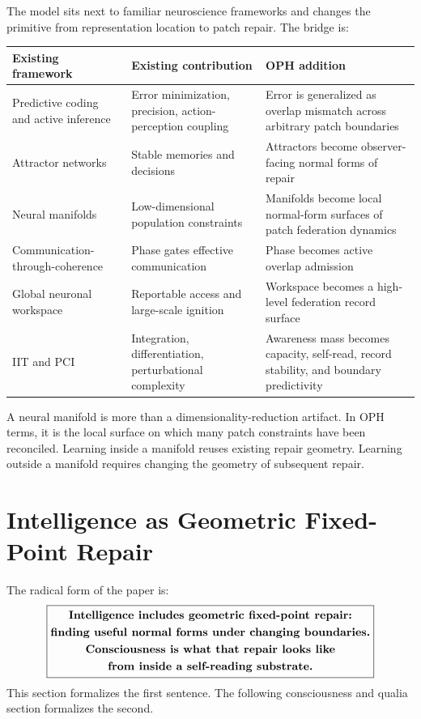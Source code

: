 \documentclass[11pt]{article}
\theoremstyle{remark}
\theoremstyle{plain}
\begin{document}
The model sits next to familiar neuroscience frameworks and changes the primitive from representation location to patch repair. The bridge is:
\begin{small}
\begin{longtable}{@{}L{0.25\textwidth}L{0.32\textwidth}L{0.34\textwidth}@{}}
\toprule
\textbf{Existing framework} & \textbf{Existing contribution} & \textbf{OPH addition} \\
\midrule
\endhead
Predictive coding and active inference~\cite{RaoBallard1999,Friston2010} & Error minimization, precision, action-perception coupling & Error is generalized as overlap mismatch across arbitrary patch boundaries \\
Attractor networks~\cite{Hopfield1982} & Stable memories and decisions & Attractors become observer-facing normal forms of repair \\
Neural manifolds~\cite{Sadtler2014,Perich2025} & Low-dimensional population constraints & Manifolds become local normal-form surfaces of patch federation dynamics \\
Communication-through-coherence~\cite{Fries2015} & Phase gates effective communication & Phase becomes active overlap admission \\
Global neuronal workspace~\cite{DehaeneChangeux2011} & Reportable access and large-scale ignition & Workspace becomes a high-level federation record surface \\
IIT and PCI~\cite{Albantakis2023IIT,Casali2013PCI} & Integration, differentiation, perturbational complexity & Awareness mass becomes capacity, self-read, record stability, and boundary predictivity \\
\bottomrule
\end{longtable}
\end{small}

A neural manifold is more than a dimensionality-reduction artifact. In OPH terms, it is the local surface on which many patch constraints have been reconciled. Learning inside a manifold reuses existing repair geometry. Learning outside a manifold requires changing the geometry of subsequent repair.

\section{Intelligence as Geometric Fixed-Point Repair}

The radical form of the paper is:
\[
\boxed{
\begin{gathered}
\text{\bfseries Intelligence includes geometric fixed-point repair:}\\
\text{\bfseries finding useful normal forms under changing boundaries.}\\
\text{\bfseries Consciousness is what that repair looks like}\\
\text{\bfseries from inside a self-reading substrate.}
\end{gathered}
}
\]
This section formalizes the first sentence. The following consciousness and qualia section formalizes the second.
\end{document}
